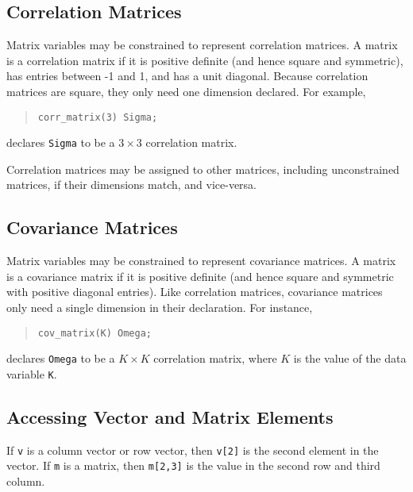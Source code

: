\documentclass[10pt]{report}
\newcommand{\code}[1]{{\tt #1}}
\begin{document}
\subsection{Correlation Matrices}

Matrix variables may be constrained to represent correlation matrices.
A matrix is a correlation matrix if it is positive definite (and hence
square and symmetric), has entries between -1 and 1, and has a unit
diagonal.  Because correlation matrices are square, they only need one
dimension declared.  For example,
%
\begin{quote}
\begin{Verbatim} 
corr_matrix(3) Sigma;
\end{Verbatim}
\end{quote}
% 
declares \code{Sigma} to be a $3 \times 3$ correlation matrix.

Correlation matrices may be assigned to other matrices, including
unconstrained matrices, if their dimensions match, and vice-versa.

\subsection{Covariance Matrices}

Matrix variables may be constrained to represent covariance matrices.
A matrix is a covariance matrix if it is positive definite (and hence
square and symmetric with positive diagonal entries).  Like
correlation matrices, covariance matrices only need a single dimension
in their declaration.  For instance,
%
\begin{quote}
\begin{Verbatim} 
cov_matrix(K) Omega;
\end{Verbatim}
\end{quote}
% 
declares \code{Omega} to be a $K \times K$ correlation matrix, where
$K$ is the value of the data variable \code{K}.

\subsection{Accessing Vector and Matrix Elements}

If \code{v} is a column vector or row vector, then \code{v[2]} is the
second element in the vector.  If \code{m} is a matrix, then
\code{m[2,3]} is the value in the second row and third column.
\end{document}
